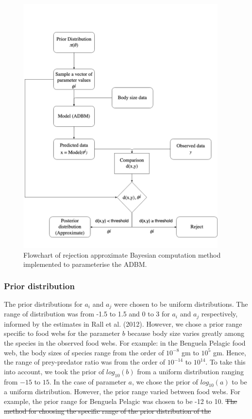 \documentclass{article}
\providecommand{\DIFdeltex}[1]{{\protect\color{red}\sout{#1}}}                      %
\providecommand{\DIFaddbegin}{} %
\providecommand{\DIFdelbegin}{} %
\providecommand{\DIFdelend}{} %
\providecommand{\DIFaddbeginFL}{} %
\providecommand{\DIFaddendFL}{} %
\providecommand{\DIFdelbeginFL}{} %
\providecommand{\DIFdelendFL}{} %
\providecommand{\DIFdel}[1]{\texorpdfstring{\DIFdeltex{#1}}{}} %
\newcommand{\DIFscaledelfig}{0.5}
\newlength{\DIFdelgraphicswidth} %
\newlength{\DIFdelgraphicsheight} %
\newcommand{\DIFaddincludegraphics}[2][]{{\color{blue}\fbox{\DIFOincludegraphics[#1]{#2}}}} %
\newcommand{\DIFdelincludegraphics}[2][]{%
\sbox{\DIFdelgraphicsbox}{\DIFOincludegraphics[#1]{#2}}%
\settoboxwidth{\DIFdelgraphicswidth}{\DIFdelgraphicsbox} %
\settoboxtotalheight{\DIFdelgraphicsheight}{\DIFdelgraphicsbox} %
\scalebox{\DIFscaledelfig}{%
\parbox[b]{\DIFdelgraphicswidth}{\usebox{\DIFdelgraphicsbox}\\[-\baselineskip] \rule{\DIFdelgraphicswidth}{0em}}\llap{\resizebox{\DIFdelgraphicswidth}{\DIFdelgraphicsheight}{%
\setlength{\unitlength}{\DIFdelgraphicswidth}%
\begin{picture}(1,1)%
\thicklines\linethickness{2pt} %
{\color[rgb]{1,0,0}\put(0,0){\framebox(1,1){}}}%
{\color[rgb]{1,0,0}\put(0,0){\line( 1,1){1}}}%
{\color[rgb]{1,0,0}\put(0,1){\line(1,-1){1}}}%
\end{picture}%
}\hspace*{3pt}}} %
} %
\DeclareRobustCommand{\DIFaddbegin}{\DIFOaddbegin \let\includegraphics\DIFaddincludegraphics} %
\DeclareRobustCommand{\DIFdelbegin}{\DIFOdelbegin \let\includegraphics\DIFdelincludegraphics} %
\DeclareRobustCommand{\DIFdelend}{\DIFOaddend \let\includegraphics\DIFOincludegraphics} %
\DeclareRobustCommand{\DIFaddbeginFL}{\DIFOaddbeginFL \let\includegraphics\DIFaddincludegraphics} %
\DeclareRobustCommand{\DIFaddendFL}{\DIFOaddendFL \let\includegraphics\DIFOincludegraphics} %
\DeclareRobustCommand{\DIFdelbeginFL}{\DIFOdelbeginFL \let\includegraphics\DIFdelincludegraphics} %
\DeclareRobustCommand{\DIFdelendFL}{\DIFOaddendFL \let\includegraphics\DIFOincludegraphics} %
\begin{document}
\begin{figure}

{\centering \DIFdelbeginFL %
\DIFdelendFL \DIFaddbeginFL \includegraphics[width=400px]{fig/schematic} 
\DIFaddendFL 

}

\caption{\label{fig:fig_m1} Flowchart of rejection approximate Bayesian computation method implemented to parameterise the ADBM.}\label{fig:unnamed-chunk-3}
\end{figure}

\hypertarget{prior-distribution}{%
\subsubsection{Prior distribution}\label{prior-distribution}}

The prior distributions for \(a_i\) and \(a_j\) were chosen to be
uniform distributions. The range of distribution was from -1.5 to 1.5
and 0 to 3 for \(a_i\) and \(a_j\) respectively, informed by the
estimates in Rall et al. (2012). However, we chose a prior range
specific to food webs for the parameter \(b\) because body size varies
greatly among the species in the observed food webs. For example: in the
Benguela Pelagic food web, the body sizes of species range from the
order of \(10^{-8}\) gm to \(10^5\) gm. Hence, the range of
prey-predator ratio was from the order of \(10^{-14}\) to \(10^{14}\).
To take this into account, we took the prior of \(log_{10}(b)\) from a
uniform distribution ranging from \(-15\) to \(15\). In the case of
parameter \(a\), we chose the prior of \(log_{10}(a)\) to be a uniform
distribution. However, the prior range varied between food webs. For
example, the prior range for Benguela Pelagic was chosen to be -12 to
10.
\DIFdelbegin \DIFdel{The method for choosing the specific range of the prior distribution
of the }\DIFdelend \DIFaddbegin 
\end{document}
